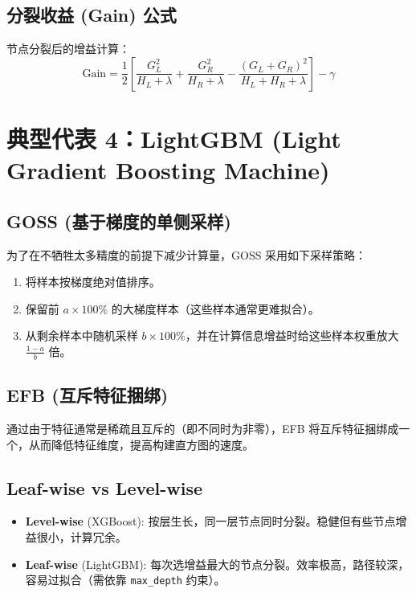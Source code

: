\documentclass[12pt, a4paper]{book}
\begin{document}
\subsection{分裂收益 (Gain) 公式}
节点分裂后的增益计算：
$$ \text{Gain} = \frac{1}{2} \left[ \frac{G_L^2}{H_{L}+\lambda} + \frac{G_R^2}{H_{R}+\lambda} - \frac{(G_L+G_R)^2}{H_{L}+H_{R}+\lambda} \right] - \gamma $$

\section{典型代表 4：LightGBM (Light Gradient Boosting Machine)}

\subsection{GOSS (基于梯度的单侧采样)}
为了在不牺牲太多精度的前提下减少计算量，GOSS 采用如下采样策略：
\begin{enumerate}
    \item 将样本按梯度绝对值排序。
    \item 保留前 $a \times 100\%$ 的大梯度样本（这些样本通常更难拟合）。
    \item 从剩余样本中随机采样 $b \times 100\%$，并在计算信息增益时给这些样本权重放大 $\frac{1-a}{b}$ 倍。
\end{enumerate}

\subsection{EFB (互斥特征捆绑)}
通过由于特征通常是稀疏且互斥的（即不同时为非零），EFB 将互斥特征捆绑成一个，从而降低特征维度，提高构建直方图的速度。

\subsection{Leaf-wise vs Level-wise}
\begin{itemize}
    \item \textbf{Level-wise} (XGBoost): 按层生长，同一层节点同时分裂。稳健但有些节点增益很小，计算冗余。
    \item \textbf{Leaf-wise} (LightGBM): 每次选增益最大的节点分裂。效率极高，路径较深，容易过拟合（需依靠 \texttt{max\_depth} 约束）。
\end{itemize}
\end{document}
